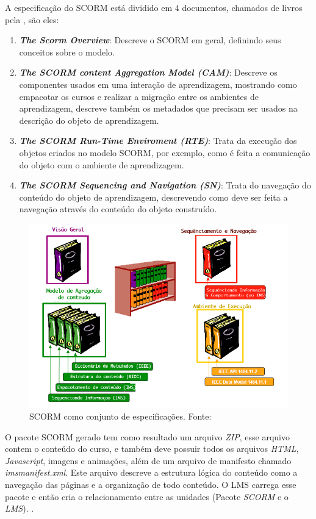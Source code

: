 A especificação do \ac{SCORM} está dividido em 4 documentos, chamados de livros pela \cite{adl}, são eles:
\begin{enumerate}
  \item \textbf{\textit{The Scorm Overview}}: Descreve o \ac{SCORM} em geral, definindo seus conceitos sobre o modelo.
  \item \textbf{\textit{The SCORM content Aggregation Model (CAM)}}: Descreve os componentes usados em uma interação de aprendizagem, mostrando como empacotar os cursos e realizar a migração entre os ambientes de aprendizagem, descreve também os metadados que precisam ser usados na descrição do objeto de aprendizagem.
  \item \textbf{\textit{The SCORM Run-Time Enviroment (RTE)}}: Trata da execução dos objetos criados no modelo \ac{SCORM}, por exemplo, como é feita a comunicação do objeto com o ambiente de aprendizagem.
  \item \textbf{\textit{The SCORM Sequencing and Navigation (SN)}}: Trata do navegação do conteúdo do objeto de aprendizagem, descrevendo como deve ser feita a navegação através do conteúdo do objeto construído.
\end{enumerate}

\begin{figure}[h]
  \centering
  \includegraphics[keepaspectratio=true,scale=0.7]{figuras/scorm-funcionamento-dutra_traduzido.png}
  \caption{SCORM como conjunto de especificações. Fonte: }
  \label{fig:scorm-funcionamento-dutra}
\end{figure}

O pacote \ac{SCORM} gerado tem como resultado um arquivo \textit{ZIP}, esse arquivo contem o conteúdo do curso, e também deve possuir todos os arquivos \textit{HTML}, \textit{Javascript}, imagens e animações, além de um arquivo de manifesto chamado \textit{imsmanifest.xml}. Este arquivo descreve a estrutura lógica do conteúdo como a navegação das páginas e a organização de todo conteúdo. O \ac{LMS} carrega esse pacote e então cria o relacionamento entre as unidades (Pacote \textit{SCORM} e o \textit{LMS}). \cite[p.~39]{fernandes-scorm}.

